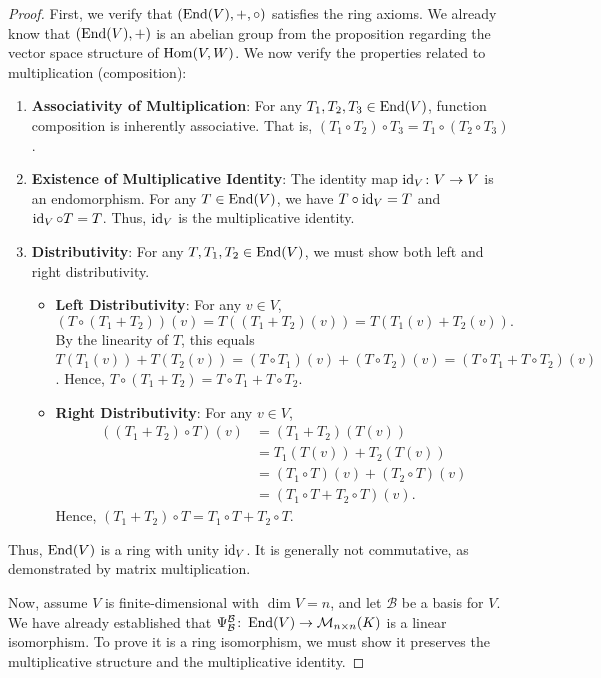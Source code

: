 \begin{proof}
  First, we verify that $(\operatorname{End}(V), +, \circ)$ satisfies the ring axioms. We already know that $(\operatorname{End}(V), +)$ is an abelian group from the proposition regarding the vector space structure of $\operatorname{Hom}(V,W)$. We now verify the properties related to multiplication (composition):
  \begin{enumerate}
    \item \textbf{Associativity of Multiplication}: For any $T_1, T_2, T_3 \in \operatorname{End}(V)$, function composition is inherently associative. That is, $(T_1 \circ T_2) \circ T_3 = T_1 \circ (T_2 \circ T_3)$.
    \item \textbf{Existence of Multiplicative Identity}: The identity map $\operatorname{id}_V \colon V \to V$ is an endomorphism. For any $T \in \operatorname{End}(V)$, we have $T \circ \operatorname{id}_V = T$ and $\operatorname{id}_V \circ T = T$. Thus, $\operatorname{id}_V$ is the multiplicative identity.
    \item \textbf{Distributivity}: For any $T, T_1, T_2 \in \operatorname{End}(V)$, we must show both left and right distributivity.
    \begin{itemize}
      \item \textbf{Left Distributivity}: For any $v \in V$,
      \[ (T \circ (T_1 + T_2))(v) = T((T_1 + T_2)(v)) = T(T_1(v) + T_2(v)). \]
      By the linearity of $T$, this equals $T(T_1(v)) + T(T_2(v)) = (T \circ T_1)(v) + (T \circ T_2)(v) = (T \circ T_1 + T \circ T_2)(v)$.
      Hence, $T \circ (T_1 + T_2) = T \circ T_1 + T \circ T_2$.
      \item \textbf{Right Distributivity}: For any $v \in V$,
      \begin{align*}
        ((T_1 + T_2) \circ T)(v) &= (T_1 + T_2)(T(v)) \\
        &= T_1(T(v)) + T_2(T(v)) \\
        &= (T_1 \circ T)(v) + (T_2 \circ T)(v) \\
        &= (T_1 \circ T + T_2 \circ T)(v).
      \end{align*}
      Hence, $(T_1 + T_2) \circ T = T_1 \circ T + T_2 \circ T$.
    \end{itemize}
  \end{enumerate}
  Thus, $\operatorname{End}(V)$ is a ring with unity $\operatorname{id}_V$. It is generally not commutative, as demonstrated by matrix multiplication.

  Now, assume $V$ is finite-dimensional with $\dim V = n$, and let $\mathcal{B}$ be a basis for $V$. We have already established that $\Psi_{\mathcal{B}}^{\mathcal{B}} \colon \operatorname{End}(V) \to \mathcal{M}_{n \times n}(K)$ is a linear isomorphism. To prove it is a ring isomorphism, we must show it preserves the multiplicative structure and the multiplicative identity.


\end{proof}
